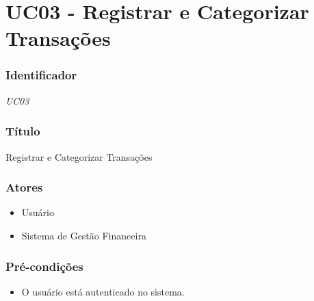 \chapter{UC03 - Registrar e Categorizar Transações}
\label{apendiceUC03}

\subsection*{Identificador}
\textit{UC03}

\subsection*{Título}
Registrar e Categorizar Transações

\subsection*{Atores}
\begin{addmargin}[1.5cm]{0cm}
	\begin{itemize}
		\item Usuário
		\item Sistema de Gestão Financeira
	\end{itemize}
\end{addmargin}

\subsection*{Pré-condições}
\begin{addmargin}[1.5cm]{0cm}
	\begin{itemize}
		\item O usuário está autenticado no sistema.
	\end{itemize}
\end{addmargin}

